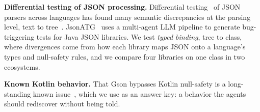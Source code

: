 \textbf{Differential testing of JSON processing.} Differential
testing~\cite{mckeeman1998differential} of JSON parsers across languages has
found many semantic discrepancies at the parsing level, text to
tree~\cite{moller2024crosslanguage}. JsonATG~\cite{wang2025jsonatg} uses a
multi-agent LLM pipeline to generate bug-triggering tests for Java JSON
libraries. We test \emph{typed binding}, tree to class, where divergences
come from how each library maps JSON onto a language's types and
null-safety rules, and we compare four libraries on one class in two
ecosystems.

\textbf{Known Kotlin behavior.} That Gson bypasses Kotlin null-safety is a
long-standing known issue~\cite{gsonissue1657}, which we use as an answer
key: a behavior the agents should rediscover without being told.
